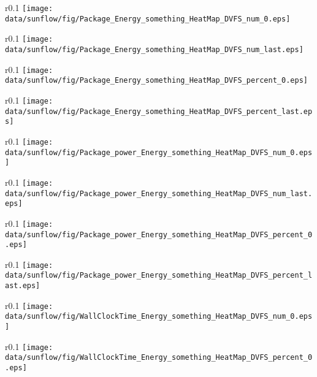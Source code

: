 \documentclass{article}
\begin{document}
\begin{wrapfigure}[10]{r}{0.1\textwidth}
\texttt{[image: data/sunflow/fig/Package\_Energy\_something\_HeatMap\_DVFS\_num\_0.eps]}
\end{wrapfigure}
\begin{wrapfigure}[10]{r}{0.1\textwidth}
\texttt{[image: data/sunflow/fig/Package\_Energy\_something\_HeatMap\_DVFS\_num\_last.eps]}
\end{wrapfigure}
\begin{wrapfigure}[10]{r}{0.1\textwidth}
\texttt{[image: data/sunflow/fig/Package\_Energy\_something\_HeatMap\_DVFS\_percent\_0.eps]}
\end{wrapfigure}
\begin{wrapfigure}[10]{r}{0.1\textwidth}
\texttt{[image: data/sunflow/fig/Package\_Energy\_something\_HeatMap\_DVFS\_percent\_last.eps]}
\end{wrapfigure}
\begin{wrapfigure}[10]{r}{0.1\textwidth}
\texttt{[image: data/sunflow/fig/Package\_power\_Energy\_something\_HeatMap\_DVFS\_num\_0.eps]}
\end{wrapfigure}
\begin{wrapfigure}[10]{r}{0.1\textwidth}
\texttt{[image: data/sunflow/fig/Package\_power\_Energy\_something\_HeatMap\_DVFS\_num\_last.eps]}
\end{wrapfigure}
\begin{wrapfigure}[10]{r}{0.1\textwidth}
\texttt{[image: data/sunflow/fig/Package\_power\_Energy\_something\_HeatMap\_DVFS\_percent\_0.eps]}
\end{wrapfigure}
\begin{wrapfigure}[10]{r}{0.1\textwidth}
\texttt{[image: data/sunflow/fig/Package\_power\_Energy\_something\_HeatMap\_DVFS\_percent\_last.eps]}
\end{wrapfigure}
\begin{wrapfigure}[10]{r}{0.1\textwidth}
\texttt{[image: data/sunflow/fig/WallClockTime\_Energy\_something\_HeatMap\_DVFS\_num\_0.eps]}
\end{wrapfigure}
\begin{wrapfigure}[10]{r}{0.1\textwidth}
\texttt{[image: data/sunflow/fig/WallClockTime\_Energy\_something\_HeatMap\_DVFS\_percent\_0.eps]}
\end{wrapfigure}
\end{document}
